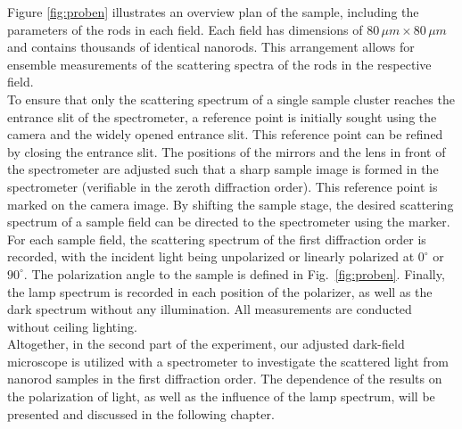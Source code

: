 Figure \ref{fig:proben} illustrates an overview plan of the sample, 
including the parameters of the rods in each field. 
Each field has dimensions of $80\,\si{\mu m}\times 80\,\si{\mu m}$ and contains thousands of identical nanorods. 
This arrangement allows for ensemble measurements of the scattering spectra of the rods in the respective field. \\
To ensure that only the scattering spectrum of a single sample cluster reaches the entrance slit of the spectrometer, 
a reference point is initially sought using the camera and the widely opened entrance slit. 
This reference point can be refined by closing the entrance slit. 
The positions of the mirrors and the lens in front of the spectrometer are adjusted such that a sharp sample image 
is formed in the spectrometer (verifiable in the zeroth diffraction order). 
This reference point is marked on the camera image. By shifting the sample stage, the desired scattering spectrum 
of a sample field can be directed to the spectrometer using the marker. \\
For each sample field, the scattering spectrum of the first diffraction order is recorded, with the incident 
light being unpolarized or linearly polarized at $0^{\circ}$ or $90^{\circ}$. 
The polarization angle to the sample is defined in Fig.~\ref{fig:proben}. 
Finally, the lamp spectrum is recorded in each position of the polarizer, as well as the dark spectrum without any illumination. 
All measurements are conducted without ceiling lighting. \\
Altogether, in the second part of the experiment, our adjusted dark-field microscope is 
utilized with a spectrometer to investigate the scattered light from nanorod samples 
in the first diffraction order.
The dependence of the results on the polarization of light, as well as the influence of the lamp spectrum, 
will be presented and discussed in the following chapter. \\

